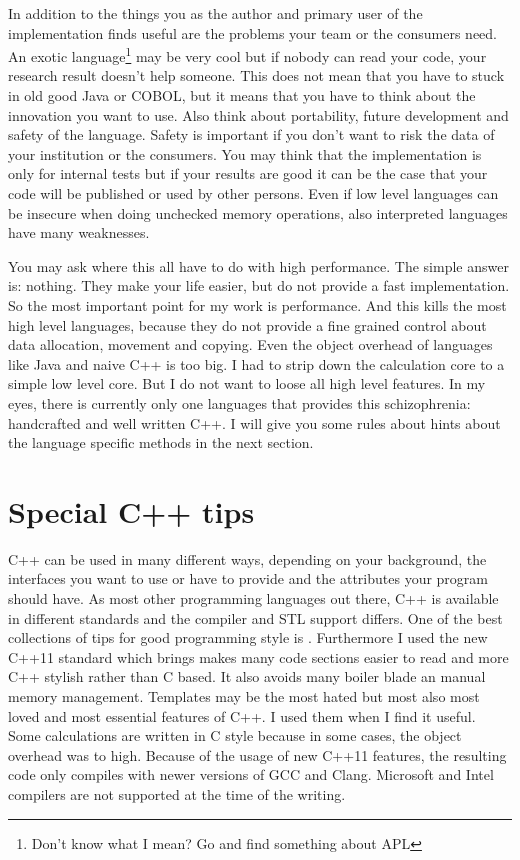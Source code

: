 In addition to the things you as the author and primary user of the implementation finds useful are the problems your team or the consumers need. An exotic language\footnote{Don't know what I mean? Go and find something about APL} may be very cool but if nobody can read your code, your research result doesn't help someone. This does not mean that you have to stuck in old good Java or COBOL, but it means that you have to think about the innovation you want to use. Also think about portability, future development and safety of the language. Safety is important if you don't want to risk the data of your institution or the consumers. You may think that the implementation is only for internal tests but if your results are good it can be the case that your code will be published or used by other persons. Even if low level languages can be insecure when doing unchecked memory operations, also interpreted languages have many weaknesses.

You may ask where this all have to do with high performance. The simple answer is: nothing. They make your life easier, but do not provide a fast implementation. So the most important point for my work is performance. And this kills the most high level languages, because they do not provide a fine grained control about data allocation, movement and copying. Even the object overhead of languages like Java and naive C++ is too big. I had to strip down the calculation core to a simple low level core. But I do not want to loose all high level features. In my eyes, there is currently only one languages that provides this schizophrenia: handcrafted and well written C++. I will give you some rules about hints about the language specific methods in the next section.

\section{Special C++ tips}
C++ can be used in many different ways, depending on your background, the interfaces you want to use or have to provide and the attributes your program should have. As most other programming languages out there, C++ is available in different standards and the compiler and STL support differs. One of the best collections of tips for good programming style is \cite{effectiveCpp}. Furthermore I used the new C++11 standard which brings makes many code sections easier to read and more C++ stylish rather than C based. It also avoids many boiler blade an manual memory management. Templates may be the most hated but most also most loved and most essential features of C++. I used them when I find it useful. Some calculations are written in C style because in some cases, the object overhead was to high. Because of the usage of new C++11 features, the resulting code only compiles with newer versions of GCC and Clang. Microsoft and Intel compilers are not supported at the time of the writing.

